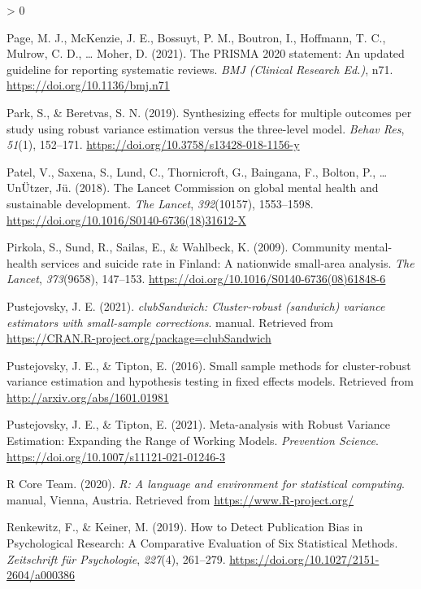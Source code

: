 \documentclass[
  english,
  man]{apa6}
\newlength{\cslhangindent}
\newenvironment{CSLReferences}[2] %
 {%
  \setlength{\parindent}{0pt}
  \ifodd #1 \everypar{\setlength{\hangindent}{\cslhangindent}}\ignorespaces\fi
  \ifnum #2 > 0
  \setlength{\parskip}{#2\baselineskip}
  \fi
 }%
 {}
\begin{document}
\begin{CSLReferences}{1}{0}
\leavevmode\hypertarget{ref-page2021}{}%
Page, M. J., McKenzie, J. E., Bossuyt, P. M., Boutron, I., Hoffmann, T. C., Mulrow, C. D., \ldots{} Moher, D. (2021). The {PRISMA} 2020 statement: An updated guideline for reporting systematic reviews. \emph{BMJ (Clinical Research Ed.)}, n71. \url{https://doi.org/10.1136/bmj.n71}

\leavevmode\hypertarget{ref-park2019}{}%
Park, S., \& Beretvas, S. N. (2019). Synthesizing effects for multiple outcomes per study using robust variance estimation versus the three-level model. \emph{Behav Res}, \emph{51}(1), 152--171. \url{https://doi.org/10.3758/s13428-018-1156-y}

\leavevmode\hypertarget{ref-patel2018}{}%
Patel, V., Saxena, S., Lund, C., Thornicroft, G., Baingana, F., Bolton, P., \ldots{} UnÜtzer, Jü. (2018). The {Lancet Commission} on global mental health and sustainable development. \emph{The Lancet}, \emph{392}(10157), 1553--1598. \url{https://doi.org/10.1016/S0140-6736(18)31612-X}

\leavevmode\hypertarget{ref-pirkola2009}{}%
Pirkola, S., Sund, R., Sailas, E., \& Wahlbeck, K. (2009). Community mental-health services and suicide rate in {Finland}: A nationwide small-area analysis. \emph{The Lancet}, \emph{373}(9658), 147--153. \url{https://doi.org/10.1016/S0140-6736(08)61848-6}

\leavevmode\hypertarget{ref-pustejovsky2021a}{}%
Pustejovsky, J. E. (2021). \emph{{clubSandwich}: Cluster-robust (sandwich) variance estimators with small-sample corrections}. manual. Retrieved from \url{https://CRAN.R-project.org/package=clubSandwich}

\leavevmode\hypertarget{ref-pustejovsky2016}{}%
Pustejovsky, J. E., \& Tipton, E. (2016). Small sample methods for cluster-robust variance estimation and hypothesis testing in fixed effects models. Retrieved from \url{http://arxiv.org/abs/1601.01981}

\leavevmode\hypertarget{ref-pustejovsky2021}{}%
Pustejovsky, J. E., \& Tipton, E. (2021). Meta-analysis with {Robust Variance Estimation}: Expanding the {Range} of {Working Models}. \emph{Prevention Science}. \url{https://doi.org/10.1007/s11121-021-01246-3}

\leavevmode\hypertarget{ref-rcoreteam2020}{}%
R Core Team. (2020). \emph{R: A language and environment for statistical computing}. manual, {Vienna, Austria}. Retrieved from \url{https://www.R-project.org/}

\leavevmode\hypertarget{ref-renkewitz2019}{}%
Renkewitz, F., \& Keiner, M. (2019). How to {Detect Publication Bias} in {Psychological Research}: A {Comparative Evaluation} of {Six Statistical Methods}. \emph{Zeitschrift für Psychologie}, \emph{227}(4), 261--279. \url{https://doi.org/10.1027/2151-2604/a000386}


\end{CSLReferences}
\end{document}
